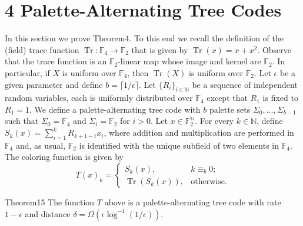 \section*{4 Palette-Alternating Tree Codes}
In this section we prove Theorem4. To this end we recall the definition of the (field) trace function $\operatorname{Tr}:\mathbb F_4\to\mathbb F_2$ that is given by $\operatorname{Tr}(x)=x+x^2$. Observe that the trace function is an $\mathbb F_2$-linear map whose image and kernel are $\mathbb F_2$. In particular, if $X$ is uniform over $\mathbb F_4$, then $\operatorname{Tr}(X)$ is uniform over $\mathbb F_2$.
Let $\epsilon$ be a given parameter and define $b=\lceil1/\epsilon\rceil$. Let $\{R_i\}_{i\in\mathbb N}$ be a sequence of independent random variables, each is uniformly distributed over $\mathbb F_4$ except that $R_1$ is fixed to $R_1=1$. We define a palette-alternating tree code with $b$ palette sets $\Sigma_0,\ldots,\Sigma_{b-1}$ such that $\Sigma_0=\mathbb F_4$ and $\Sigma_i=\mathbb F_2$ for $i>0$. Let $x\in\mathbb F_2^{\mathbb N}$. For every $k\in\mathbb N$, define $S_k(x)=\sum_{i=1}^kR_{k+1-i}x_i$, where addition and multiplication are performed in $\mathbb F_4$ and, as usual, $\mathbb F_2$ is identified with the unique subfield of two elements in $\mathbb F_4$. The coloring function is given by
\[
T(x)_k=\begin{cases}S_k(x),&k\equiv_b0;\\\operatorname{Tr}(S_k(x)),&\text{otherwise}.\end{cases}
\]
\begin{authorclaim}{Theorem15}
The function $T$ above is a palette-alternating tree code with rate $1-\epsilon$ and distance $\delta=\Omega(\epsilon\log^{-1}(1/\epsilon))$.
\end{authorclaim}
